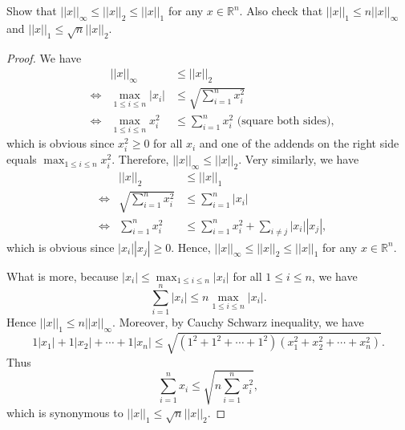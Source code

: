 \documentclass[12pt, a4paper]{article}
\theoremstyle{plain}
\newcommand{\R}{\mathbb{R}}
\begin{document}
\begin{exercise}{18}
Show that $||x||_\infty\leq ||x||_2\leq ||x||_1$ for any $x\in\R^n$. Also check that $||x||_1\leq n||x||_\infty$ and $||x||_1\leq \sqrt{n}||x||_2$.
\end{exercise}
	\begin{proof}
	We have 
	\begin{align*}
	&&||x||_\infty &\leq ||x||_2\\
	&\Leftrightarrow &\max_{1\leq i\leq n}|x_i|&\leq \sqrt{\sum_{i=1}^{n}{x_i^2}}\\
	&\Leftrightarrow &\max_{1\leq i\leq n}x_i^2&\leq \sum_{i=1}^{n}{x_i^2} \text{ (square both sides)},
	\end{align*}
	which is obvious since $x_i^2\geq 0$ for all $x_i$ and one of the addends on the right side equals $\max_{1\leq i\leq n}{x_i^2}$. Therefore, $||x||_\infty\leq ||x||_2$. Very similarly, we have 
	\begin{align*}
	&&||x||_2&\leq ||x||_1\\
	&\Leftrightarrow& \sqrt{\sum_{i=1}^{n}{x_i^2}}&\leq \sum_{i=1}^{n}{|x_i|}\\
	&\Leftrightarrow& \sum_{i=1}^{n}{x_i^2}&\leq \sum_{i=1}^{n}{x_i^2}+\sum_{i\neq j}{|x_i||x_j|},
	\end{align*}
	which is obvious since $|x_i||x_j|\geq 0$. Hence, $||x||_\infty\leq ||x||_2\leq ||x||_1$ for any $x\in \R^n$. 
	
	What is more, because $|x_i|\leq \max_{1\leq i\leq n}|x_i|$ for all $1\leq i\leq n$, we have
	\[
	\sum_{i=1}^{n}{|x_i|}\leq n\max_{1\leq i\leq n}|x_i|.
	\]
	Hence $||x||_1\leq n||x||_\infty$. Moreover, by Cauchy Schwarz inequality, we have
	\[
	1|x_1|+1|x_2|+\cdots +1|x_n|\leq \sqrt{(1^2+1^2+\cdots +1^2)(x_1^2+x_2^2+\cdots +x_n^2)}.
	\]
	Thus
	\[
	\sum_{i=1}^{n}{x_i}\leq \sqrt{n\sum_{i=1}^{n}{x_i^2}},
	\]
	which is synonymous to $||x||_1\leq \sqrt{n}||x||_2$.
	\end{proof}
\end{document}
